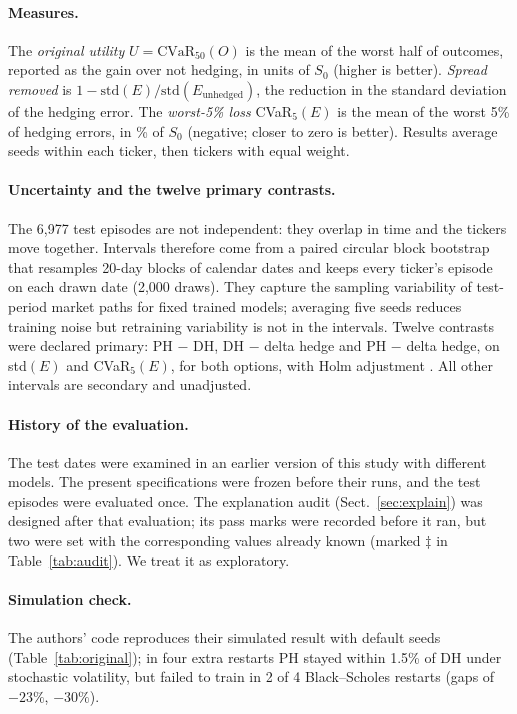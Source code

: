 \documentclass[runningheads]{llncs}
\begin{document}
\paragraph{Measures.} The \emph{original utility} $U=\mathrm{CVaR}_{50}(O)$ is the mean of the worst half
of outcomes, reported as the gain over not hedging, in units of $S_0$ (higher is better). \emph{Spread
removed} is $1-\mathrm{std}(E)/\mathrm{std}(E_{\mathrm{unhedged}})$, the reduction in the standard
deviation of the hedging error. The \emph{worst-5\% loss} CVaR$_5(E)$ is the mean of the worst 5\% of
hedging errors, in \% of $S_0$ (negative; closer to zero is better). Results average seeds within each
ticker, then tickers with equal weight.

\paragraph{Uncertainty and the twelve primary contrasts.} The 6,977 test episodes are not independent:
they overlap in time and the tickers move together. Intervals therefore come from a paired circular block
bootstrap \cite{politis1992} that resamples 20-day blocks of calendar dates and keeps every ticker's
episode on each drawn date (2,000 draws). They capture the sampling variability of test-period market
paths for fixed trained models; averaging five seeds reduces training noise but retraining variability is
not in the intervals. Twelve contrasts were declared primary: PH $-$ DH, DH $-$ delta hedge and PH $-$
delta hedge, on std$(E)$ and CVaR$_5(E)$, for both options, with Holm adjustment \cite{holm1979simple}.
All other intervals are secondary and unadjusted.

\paragraph{History of the evaluation.} The test dates were examined in an earlier version of this study
with different models. The present specifications were frozen before their runs, and the test episodes
were evaluated once. The explanation audit (Sect.~\ref{sec:explain}) was designed after that evaluation;
its pass marks were recorded before it ran, but two were set with the corresponding values already known
(marked $\ddagger$ in Table~\ref{tab:audit}). We treat it as exploratory.

\paragraph{Simulation check.} The authors' code reproduces their simulated result with default seeds
(Table~\ref{tab:original}); in four extra restarts PH stayed within 1.5\% of DH under stochastic volatility,
but failed to train in 2 of 4 Black--Scholes restarts (gaps of $-23\%$, $-30\%$).
\end{document}
